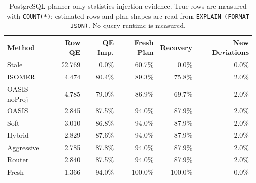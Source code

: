 \begin{table}[t]
  \centering
  \small
  \caption{PostgreSQL planner-only statistics-injection evidence. True rows are measured with \texttt{COUNT(*)}; estimated rows and plan shapes are read from \texttt{EXPLAIN (FORMAT JSON)}. No query runtime is measured.}
  \label{tab:postgres_planner_stats_injection}
  \setlength{\tabcolsep}{4pt}
  \begin{tabular}{lrrrrr}
    \toprule
    Method & Row QE & QE Imp. & Fresh Plan & Recovery & New Deviations \\
    \midrule
    Stale & 22.769 & 0.0\% & 60.7\% & 0.0\% & 0.0\% \\
    ISOMER & 4.474 & 80.4\% & 89.3\% & 75.8\% & 2.0\% \\
    OASIS-noProj & 4.785 & 79.0\% & 86.9\% & 69.7\% & 2.0\% \\
    OASIS & 2.845 & 87.5\% & 94.0\% & 87.9\% & 2.0\% \\
    Soft & 3.010 & 86.8\% & 94.0\% & 87.9\% & 2.0\% \\
    Hybrid & 2.829 & 87.6\% & 94.0\% & 87.9\% & 2.0\% \\
    Aggressive & 2.785 & 87.8\% & 94.0\% & 87.9\% & 2.0\% \\
    Router & 2.840 & 87.5\% & 94.0\% & 87.9\% & 2.0\% \\
    Fresh & 1.366 & 94.0\% & 100.0\% & 100.0\% & 0.0\% \\
    \bottomrule
  \end{tabular}
\end{table}
